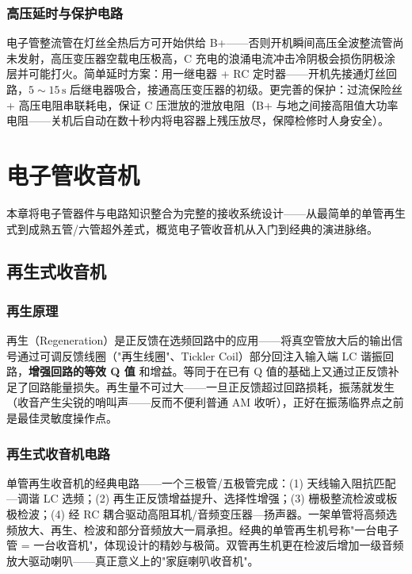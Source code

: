 \documentclass[12pt,UTF8]{ctexbook}
\begin{document}
\subsection{高压延时与保护电路}

电子管整流管在灯丝全热后方可开始供给 B+——否则开机瞬间高压全波整流管尚未发射，高压变压器空载电压极高，C 充电的浪涌电流冲击冷阴极会损伤阴极涂层并可能打火。简单延时方案：用一继电器 + RC 定时器——开机先接通灯丝回路，$5\sim15\,\mathrm{s}$ 后继电器吸合，接通高压变压器的初级。更完善的保护：过流保险丝 + 高压电阻串联耗电，保证 C 压泄放的泄放电阻（B+ 与地之间接高阻值大功率电阻——关机后自动在数十秒内将电容器上残压放尽，保障检修时人身安全）。


\chapter{电子管收音机}
\label{chap:tube_radio}

本章将电子管器件与电路知识整合为完整的接收系统设计——从最简单的单管再生式到成熟五管/六管超外差式，概览电子管收音机从入门到经典的演进脉络。

\section{再生式收音机}
\label{sec:regenerative_radio}

\subsection{再生原理}

再生（Regeneration）是正反馈在选频回路中的应用——将真空管放大后的输出信号通过可调反馈线圈（"再生线圈"、Tickler Coil）部分回注入输入端 LC 谐振回路，\textbf{增强回路的等效 Q 值} 和增益。等同于在已有 Q 值的基础上又通过正反馈补足了回路能量损失。再生量不可过大——一旦正反馈超过回路损耗，振荡就发生（收音产生尖锐的哨叫声——反而不便利普通 AM 收听），正好在振荡临界点之前是最佳灵敏度操作点。

\subsection{再生式收音机电路}

单管再生收音机的经典电路——一个三极管/五极管完成：(1) 天线输入阻抗匹配—调谐 LC 选频；(2) 再生正反馈增益提升、选择性增强；(3) 栅极整流检波或板极检波；(4) 经 RC 耦合驱动高阻耳机/音频变压器—扬声器。一架单管将高频选频放大、再生、检波和部分音频放大一肩承担。经典的单管再生机号称"一台电子管 = 一台收音机"，体现设计的精妙与极简。双管再生机更在检波后增加一级音频放大驱动喇叭——真正意义上的"家庭喇叭收音机"。
\end{document}
